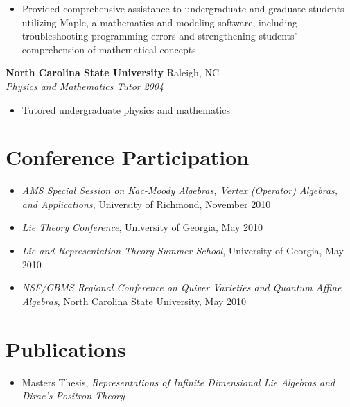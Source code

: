\documentclass[10pt]{article}
\begin{document}
\begin{itemize}

\item	Provided comprehensive assistance to undergraduate and graduate
students utilizing Maple, a mathematics and modeling software, including
troubleshooting programming errors and strengthening students’ comprehension
of mathematical concepts

\end{itemize}


\noindent
{\bf North Carolina State University} \hfill Raleigh, NC\\
{\it Physics and Mathematics Tutor} \hfill {\it 2004}

\begin{itemize}

\item	Tutored undergraduate physics and mathematics

\end{itemize}


\section*{Conference Participation}

\begin{itemize}

\item	{\it AMS Special Session on Kac-Moody Algebras, Vertex (Operator)
Algebras, and Applications}, University of Richmond, November 2010

\item	{\it Lie Theory Conference}, University of Georgia, May 2010

\item	{\it Lie and Representation Theory Summer School}, University of Georgia,
May 2010

\item	{\it NSF/CBMS Regional Conference on Quiver Varieties and Quantum Affine
Algebras}, North Carolina State University, May 2010

\end{itemize}


\section*{Publications}

\begin{itemize}

\item Masters Thesis, {\it Representations of Infinite Dimensional Lie Algebras
and Dirac's Positron Theory}

\end{itemize}
\end{document}
